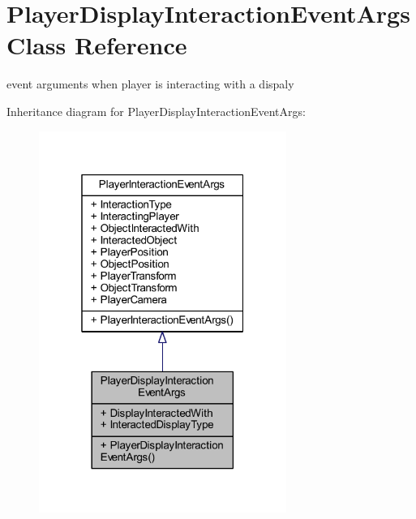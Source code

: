 \hypertarget{class_player_display_interaction_event_args}{}\section{Player\+Display\+Interaction\+Event\+Args Class Reference}
\label{class_player_display_interaction_event_args}


event arguments when player is interacting with a dispaly  




Inheritance diagram for Player\+Display\+Interaction\+Event\+Args\+:\nopagebreak
\begin{figure}[H]
\begin{center}
\leavevmode
\includegraphics[width=229pt]{class_player_display_interaction_event_args__inherit__graph}
\end{center}
\end{figure}



